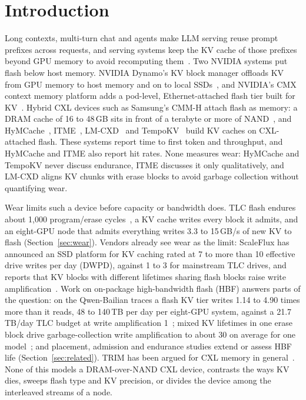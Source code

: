 \documentclass[acmsmall,screen,review]{acmart}
\begin{document}
\maketitle

\section{Introduction}
Long contexts, multi-turn chat and agents make LLM serving reuse prompt prefixes across requests, and serving systems
keep the KV cache of those prefixes beyond GPU memory to avoid recomputing
them~\cite{mooncake,lmcache,kvwild}. Two NVIDIA systems put flash below host memory. NVIDIA
Dynamo's KV block manager offloads KV from GPU memory to host memory and on to local
SSDs~\cite{dynamo_kvbm}, and NVIDIA's CMX context memory platform adds a pod-level,
Ethernet-attached flash tier built for KV~\cite{nvidia_cmx}. Hybrid CXL devices such as Samsung's
CMM-H attach flash as memory: a DRAM cache of 16 to 48\,GB sits in front of a terabyte or more of
NAND~\cite{cmmh,cmmh_hs}, and HyMCache~\cite{hymcache}, ITME~\cite{itme}, LM-CXD~\cite{lmcxd} and
TempoKV~\cite{tempokv} build KV caches on CXL-attached flash. These systems report time to first
token and throughput, and HyMCache and ITME also report hit rates. None measures wear: HyMCache and
TempoKV never discuss endurance, ITME discusses it only qualitatively, and LM-CXD aligns KV chunks
with erase blocks to avoid garbage collection without quantifying wear.

Wear limits such a device before capacity or bandwidth does. TLC flash endures about 1,000
program/erase cycles~\cite{cai_proc}, a KV cache writes every block it admits, and an eight-GPU node
that admits everything writes 3.3 to 15\,GB/s of new KV to flash (Section~\ref{sec:wear}). Vendors already see wear as the limit: ScaleFlux has
announced an SSD platform for KV caching rated at 7 to more than 10 effective drive writes per day
(DWPD), against 1 to 3 for mainstream TLC drives, and reports that KV blocks with different lifetimes
sharing flash blocks raise write amplification~\cite{scaleflux}. Work on on-package high-bandwidth
flash (HBF) answers parts of the question: on the Qwen-Bailian traces a flash KV tier writes 1.14 to
4.90 times more than it reads, 48 to 140\,TB per day per eight-GPU system, against a 21.7\,TB/day
TLC budget at write amplification 1~\cite{hbfsucks}; mixed KV lifetimes in one erase block drive
garbage-collection write amplification to about 30 on average for one model~\cite{hbflex}; and
placement, admission and endurance studies extend or assess HBF life (Section~\ref{sec:related}).
TRIM has been argued for CXL memory in general~\cite{trimcxl}. None of this models a DRAM-over-NAND CXL device,
contrasts the ways KV dies, sweeps flash type and KV precision, or divides the device among the
interleaved streams of a node.
\end{document}
